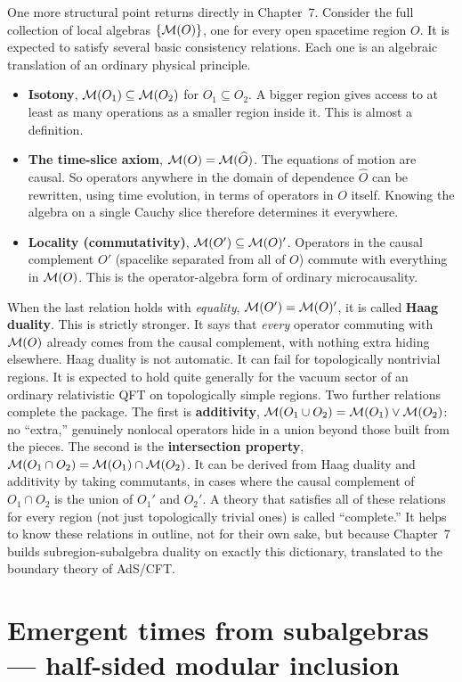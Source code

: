 One more structural point returns directly in Chapter~7. Consider the full collection of local algebras
$\{\mathcal{M}(O)\}$, one for every open spacetime region $O$. It is expected to satisfy several basic consistency
relations. Each one is an algebraic translation of an ordinary physical principle.
\begin{itemize}
\item \textbf{Isotony}, $\mathcal{M}(O_1)\subseteq\mathcal{M}(O_2)$ for $O_1\subseteq O_2$. A bigger region gives access to at
least as many operations as a smaller region inside it. This is almost a definition.
\item \textbf{The time-slice axiom}, $\mathcal{M}(O)=\mathcal{M}(\widehat O)$. The equations of motion are causal. So operators
anywhere in the domain of dependence $\widehat O$ can be rewritten, using time evolution, in terms of operators
in $O$ itself. Knowing the algebra on a single Cauchy slice therefore determines it everywhere.
\item \textbf{Locality (commutativity)}, $\mathcal{M}(O')\subseteq\mathcal{M}(O)'$. Operators in the causal complement $O'$
(spacelike separated from all of $O$) commute with everything in $\mathcal{M}(O)$. This is the operator-algebra form of
ordinary microcausality.
\end{itemize}
When the last relation holds with \emph{equality}, $\mathcal{M}(O')=\mathcal{M}(O)'$, it is called \textbf{Haag duality}. This
is strictly stronger. It says that \emph{every} operator commuting with $\mathcal{M}(O)$ already comes from the causal
complement, with nothing extra hiding elsewhere. Haag duality is not automatic. It can fail for topologically
nontrivial regions. It is expected to hold quite generally for the vacuum sector of an ordinary relativistic QFT
on topologically simple regions. Two further relations complete the package. The first is
\textbf{additivity}, $\mathcal{M}(O_1\cup O_2)=\mathcal{M}(O_1)\vee\mathcal{M}(O_2)$: no ``extra,'' genuinely nonlocal operators hide in a
union beyond those built from the pieces. The second is the \textbf{intersection property},
$\mathcal{M}(O_1\cap O_2)=\mathcal{M}(O_1)\cap\mathcal{M}(O_2)$. It can be derived from Haag duality and additivity by taking commutants,
in cases where the causal complement of $O_1\cap O_2$ is the union of $O_1'$ and $O_2'$. A theory that
satisfies all of these relations for every region (not just topologically trivial ones) is called
``complete.'' It helps to know these relations in outline, not for their own sake, but because Chapter~7 builds
subregion-subalgebra duality on exactly this dictionary, translated to the boundary theory of AdS/CFT.

\section{Emergent times from subalgebras — half-sided modular inclusion}

